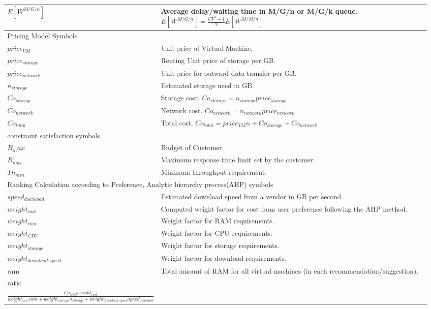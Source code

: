 \begin{center}
\begin{longtable}{p{27mm} p{106mm}}
\hline
$E[W^{M/G/n}]$	& Average delay/waiting time in M/G/n or M/G/k queue. $E[W^{M/G/n}]= \frac{CV^{2} +1}{2}E[W^{M/M/n}]$\\
\hline
\multicolumn{2}{l}{Pricing Model Symbols}\\
\hline
$price_{VM}$ & Unit price of Virtual Machine.\\
$price_{storage}$ & Renting Unit price of storage per GB. \\
$price_{network}$ & Unit price for outward data transfer per GB.\\
$n_{storage}$ & Estimated storage need in GB.\\
$Co_{storage}$ & Storage cost. $Co_{storage} = n_{storage} price_{storage}$\\
$Co_{network}$ & Network cost. $Co_{network} = n_{network} price_{network}$ \\
$Co_{total}$ & Total cost. $Co_{total} = price_{VM} n + Co_{storage} + Co_{network}$ \\
\hline
\multicolumn{2}{l}{constraint satisfaction symbols}\\
\hline
$B_max$ & Budget of Customer.\\
$R_{max}$ & Maximum response time limit set by the customer.\\
$Th_{min}$ & Minimum throughput requirement.\\
\hline
\multicolumn{2}{l}{Ranking Calculation according to Preference, Analytic hierarchy process(AHP) symbols}\\
\hline
$speed_{download}$ & Estimated download speed from a vendor in GB per second.\\
$weight_{cost}$ & Computed weight factor for cost from user preference following the AHP method.\\
$weight_{ram}$ & Weight factor for RAM requirements.\\
$weight_{CPU}$ & Weight factor for CPU requirements.\\
$weight_{storage}$ & Weight factor for storage requirements.\\
$weight_{download{\_}speed}$ & Weight factor for download requirements.\\
ram & Total amount of RAM for all virtual machines (in each recommendation/suggestion).\\
ratio & \makecell{$ratio = \frac{cost}{benifit}$ = \\ 
$\frac{ Co_{total} weight_{cost} } { weight_{ram} ram + weight_{storage} n_{storage} + weight_{download{\_}speed} speed_{dowbload} }$  }\\
\hline
\end{longtable}
\end{center}


